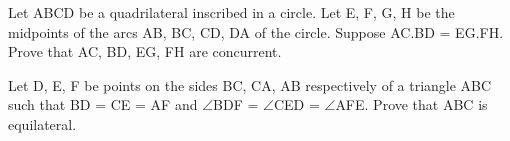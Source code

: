 \item Let ABCD be a quadrilateral inscribed in a circle. Let E, F, G, H be the midpoints of the arcs AB, BC, CD, DA of the circle. Suppose AC.BD = EG.FH. Prove that AC, BD, EG, FH are concurrent.

\item Let D, E, F be points on the sides BC, CA, AB respectively of a triangle ABC such that BD = CE = AF and
 $\angle$BDF = $\angle$CED = $\angle$AFE. Prove that ABC is equilateral.





















